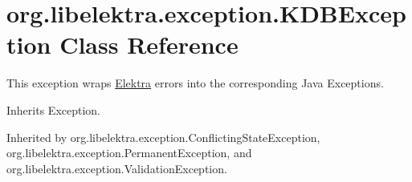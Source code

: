 \hypertarget{classorg_1_1libelektra_1_1exception_1_1KDBException}{}\section{org.\+libelektra.\+exception.\+K\+D\+B\+Exception Class Reference}
\label{classorg_1_1libelektra_1_1exception_1_1KDBException}


This exception wraps \mbox{\hyperlink{interfaceorg_1_1libelektra_1_1Elektra}{Elektra}} errors into the corresponding Java Exceptions.  




Inherits Exception.



Inherited by org.\+libelektra.\+exception.\+Conflicting\+State\+Exception, org.\+libelektra.\+exception.\+Permanent\+Exception, and org.\+libelektra.\+exception.\+Validation\+Exception.

